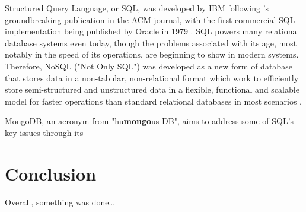 \documentclass[12pt]{report}
\begin{document}
\noindent Structured Query Language, or SQL, was developed by IBM following \textcite{codd_relational_1970}'s groundbreaking 
publication in the ACM journal, with the first commercial SQL implementation being published by Oracle in 1979 \autocite{oracle_history_nodate}.
SQL powers many relational database systems even today, though the problems associated with its age, most notably in 
the speed of its operations, are beginning to show in modern systems. Therefore, NoSQL ("Not Only SQL") was developed as 
a new form of database that stores data in a non-tabular, non-relational format which work to efficiently store 
semi-structured and unstructured data in a flexible, functional and scalable model for faster operations than standard 
relational databases in most scenarios \autocite{google_cloud_what_nodate, aws_what_nodate}. 

MongoDB, an acronym from "hu\textbf{mongo}us DB", aims to address some of SQL's key issues through its 

\chapter*{Conclusion}

Overall, something was done\dots


\printbibliography
{}
\end{document}
